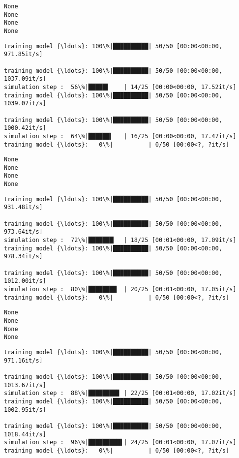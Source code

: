\documentclass[11pt]{article}
\begin{document}
    \begin{Verbatim}[commandchars=\\\{\}]
None
None
None
None
    \end{Verbatim}

    \begin{Verbatim}[commandchars=\\\{\}]
training model {\ldots}: 100\%|██████████| 50/50 [00:00<00:00, 971.85it/s]

training model {\ldots}: 100\%|██████████| 50/50 [00:00<00:00, 1037.09it/s]
simulation step :  56\%|█████▌    | 14/25 [00:00<00:00, 17.52it/s]
training model {\ldots}: 100\%|██████████| 50/50 [00:00<00:00, 1039.07it/s]

training model {\ldots}: 100\%|██████████| 50/50 [00:00<00:00, 1000.42it/s]
simulation step :  64\%|██████▍   | 16/25 [00:00<00:00, 17.47it/s]
training model {\ldots}:   0\%|          | 0/50 [00:00<?, ?it/s]
    \end{Verbatim}

    \begin{Verbatim}[commandchars=\\\{\}]
None
None
None
None
    \end{Verbatim}

    \begin{Verbatim}[commandchars=\\\{\}]
training model {\ldots}: 100\%|██████████| 50/50 [00:00<00:00, 931.48it/s]

training model {\ldots}: 100\%|██████████| 50/50 [00:00<00:00, 973.64it/s]
simulation step :  72\%|███████▏  | 18/25 [00:01<00:00, 17.09it/s]
training model {\ldots}: 100\%|██████████| 50/50 [00:00<00:00, 978.34it/s]

training model {\ldots}: 100\%|██████████| 50/50 [00:00<00:00, 1012.00it/s]
simulation step :  80\%|████████  | 20/25 [00:01<00:00, 17.05it/s]
training model {\ldots}:   0\%|          | 0/50 [00:00<?, ?it/s]
    \end{Verbatim}

    \begin{Verbatim}[commandchars=\\\{\}]
None
None
None
None
    \end{Verbatim}

    \begin{Verbatim}[commandchars=\\\{\}]
training model {\ldots}: 100\%|██████████| 50/50 [00:00<00:00, 971.16it/s]

training model {\ldots}: 100\%|██████████| 50/50 [00:00<00:00, 1013.67it/s]
simulation step :  88\%|████████▊ | 22/25 [00:01<00:00, 17.02it/s]
training model {\ldots}: 100\%|██████████| 50/50 [00:00<00:00, 1002.95it/s]

training model {\ldots}: 100\%|██████████| 50/50 [00:00<00:00, 1018.44it/s]
simulation step :  96\%|█████████▌| 24/25 [00:01<00:00, 17.07it/s]
training model {\ldots}:   0\%|          | 0/50 [00:00<?, ?it/s]
    \end{Verbatim}
\end{document}
